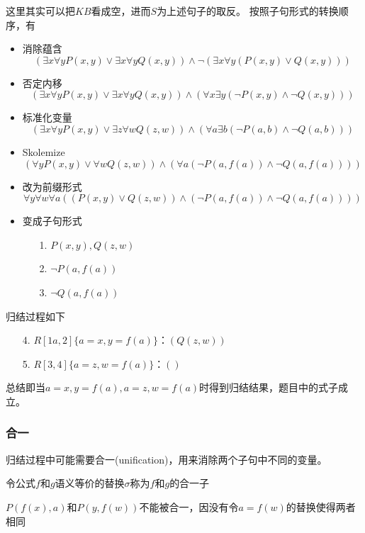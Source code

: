 \begin{analysis}
	这里其实可以把$KB$看成空，进而$S$为上述句子的取反。
	按照子句形式的转换顺序，有
    \begin{itemize}
        \item 消除蕴含
        \[(\exists x\forall y P(x,y)\lor\exists x\forall y Q(x,y))\land\lnot
        (\exists x\forall y(P(x,y)\lor Q(x,y)))\]
        \item 否定内移
        \[(\exists x\forall y P(x,y)\lor\exists x\forall y Q(x,y))\land
        (\forall x\exists y (\lnot P(x,y)\land \lnot Q(x,y)))\]
        \item 标准化变量
        \[(\exists x\forall y P(x,y)\lor\exists z\forall w Q(z,w))\land
        (\forall a\exists b (\lnot P(a,b)\land \lnot Q(a,b)))\]
        \item Skolemize
        \[(\forall y P(x,y)\lor \forall w Q(z,w))\land
        (\forall a (\lnot P(a,f(a))\land \lnot Q(a,f(a))))\]
        \item 改为前缀形式
        \[\forall y\forall w\forall a ((P(x,y)\lor Q(z,w))\land
        (\lnot P(a,f(a))\land \lnot Q(a,f(a))))\]
        \item 变成子句形式
        \begin{itemize}
            \item [1.] $P(x,y),Q(z,w)$
            \item [2.] $\lnot P(a,f(a))$
            \item [3.] $\lnot Q(a,f(a))$
        \end{itemize}
    \end{itemize}
    归结过程如下
    \begin{enumerate}
        \item [4.] $R[1a,2]\{a=x,y=f(a)\}$：$(Q(z,w))$
        \item [5.] $R[3,4]\{a=z,w=f(a)\}$：$()$
    \end{enumerate}
    总结即当$a=x,y=f(a),a=z,w=f(a)$时得到归结结果，题目中的式子成立。
\end{analysis}

\subsubsection{合一}
归结过程中可能需要合一(unification)，用来消除两个子句中不同的变量。
\begin{definition}
令公式$f$和$g$语义等价的替换$\sigma$称为$f$和$g$的合一子
\end{definition}
\begin{example}
$P(f(x),a)$和$P(y,f(w))$不能被合一，因没有令$a=f(w)$的替换使得两者相同
\end{example}

